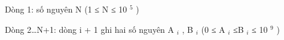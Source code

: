 Dòng 1: số nguyên N (1 ≤ N ≤ 10 $^ 5 $ )

Dòng 2…N+1: dòng i + 1 ghi hai số nguyên A $_ i $ , B $_ i $ (0 ≤ A $_ i $ ≤B $_ i $ ≤ 10 $^ 9 $ )